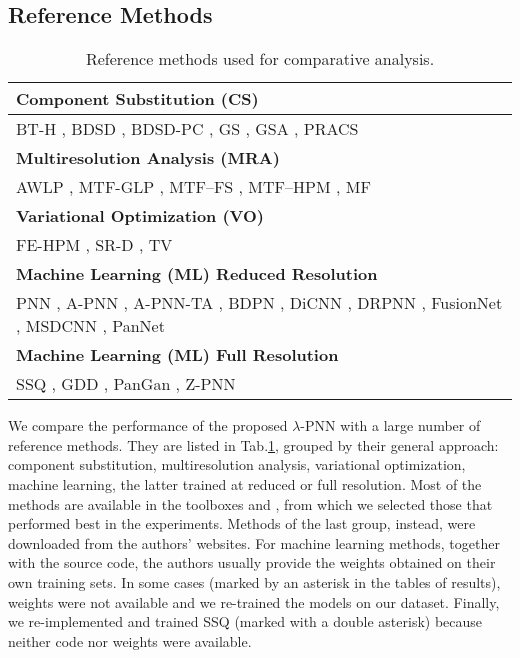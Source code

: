 \documentclass[journal]{IEEEtran}
\newcommand{\ru} {\rule{0mm}{3mm}}
\begin{document}
\subsection{Reference Methods}

\begin{table}
\centering
\setlength{\tabcolsep}{4pt}
\begin{tabular}{p{8.4cm}}
\multicolumn{1}{l}{\ru \bf Component Substitution (CS)}              \\ \hline \ru
BT-H \cite{Lolli2017}, BDSD \cite{Garzelli2008}, BDSD-PC \cite{Vivone2019}, GS \cite{Laben2000}, GSA \cite{Aiazzi2007}, PRACS \cite{Choi2011} \vspace{2mm} \\
\multicolumn{1}{l}{\ru \bf Multiresolution Analysis (MRA)}           \\ \hline \ru
AWLP \cite{Otazu2005}, MTF-GLP \cite{Alparone2017}, MTF--FS \cite{Vivone2018a}, MTF--HPM \cite{Alparone2017}, MF \cite{Restaino2016} \vspace{2mm} \\
\multicolumn{1}{l}{\ru \bf Variational Optimization (VO)}            \\ \hline \ru
FE-HPM \cite{Vivone2015a}, SR-D \cite{Vicinanza2015}, TV \cite{Palsson2014} \vspace{2mm} \\
\multicolumn{1}{l}{\ru \bf Machine Learning (ML) Reduced Resolution} \\ \hline \ru
PNN \cite{Masi2016}, A-PNN \cite{Scarpa2018a}, A-PNN-TA \cite{Scarpa2018a}, BDPN \cite{Zhan2019}, DiCNN \cite{He2019}, DRPNN \cite{Wei2017L}, FusionNet \cite{Deng2020}, MSDCNN \cite{Yuan2018}, PanNet \cite{Yang2017} \vspace{2mm} \\
\multicolumn{1}{l}{\ru \bf Machine Learning (ML) Full Resolution}    \\ \hline \ru
SSQ \cite{Luo2020}, GDD \cite{Uezato2020}, PanGan \cite{Ma2020}, Z-PNN \cite{Ciotola2022} \\
\end{tabular}
\caption{Reference methods used for comparative analysis.}
\label{tab:methods}
\end{table}

We compare the performance of the proposed $\lambda$-PNN with a large number of reference methods.
They are listed in Tab.\ref{tab:methods}, grouped by their general approach:
component substitution, multiresolution analysis, variational optimization, machine learning,
the latter trained at reduced or full resolution.
Most of the methods are available in the toolboxes \cite{Vivone2020} and \cite{Deng2022}, from which we selected those that performed best in the experiments.
Methods of the last group, instead, were downloaded from the authors' websites.
For machine learning methods,
together with the source code, the authors usually provide the weights obtained on their own training sets.
In some cases (marked by an asterisk in the tables of results), weights were not available and we re-trained the models on our dataset.
Finally, we re-implemented and trained SSQ (marked with a double asterisk) because neither code nor weights were available.
\end{document}
